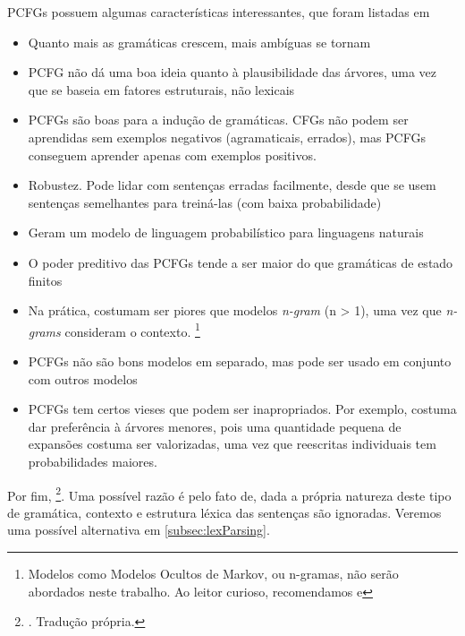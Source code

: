 PCFGs possuem algumas características interessantes, que foram listadas em \cite[p~386-388]{Manning1999FoundationsNLP}
\begin{itemize}
    \item Quanto mais as gramáticas crescem, mais ambíguas se tornam
    \item PCFG não dá uma boa ideia quanto à plausibilidade das árvores, uma vez que se baseia em fatores estruturais, não lexicais
    \item PCFGs são boas para a indução de gramáticas.  CFGs não podem ser aprendidas sem exemplos negativos (agramaticais, errados), mas PCFGs conseguem aprender apenas com exemplos positivos. 
    \item Robustez. Pode lidar com sentenças erradas facilmente, desde que se usem sentenças semelhantes para treiná-las (com baixa probabilidade)
    \item Geram um modelo de linguagem probabilístico para linguagens naturais
    \item O poder preditivo das PCFGs tende a ser maior do que gramáticas de estado finitos
    \item Na prática, costumam ser piores que modelos \textit{n-gram} (n > 1), uma vez que \textit{n-grams} consideram o contexto.
    \footnote{Modelos como Modelos Ocultos de Markov, ou n-gramas, não serão abordados neste trabalho. Ao leitor curioso, recomendamos \cite[p~191]{Manning1999FoundationsNLP} e }
    \item PCFGs não são bons modelos em separado, mas pode ser usado em conjunto com outros modelos
    \item PCFGs tem certos vieses que podem ser inapropriados. Por exemplo, costuma dar preferência à árvores menores, pois uma quantidade pequena de expansões costuma ser valorizadas, uma vez que reescritas individuais tem probabilidades maiores.
\end{itemize}

Por fim,  
\footnote{. Tradução própria.}. Uma possível razão é pelo fato de, dada a própria natureza deste tipo de gramática, contexto e estrutura léxica das sentenças são ignoradas. Veremos uma possível alternativa em \ref{subsec:lexParsing}.

